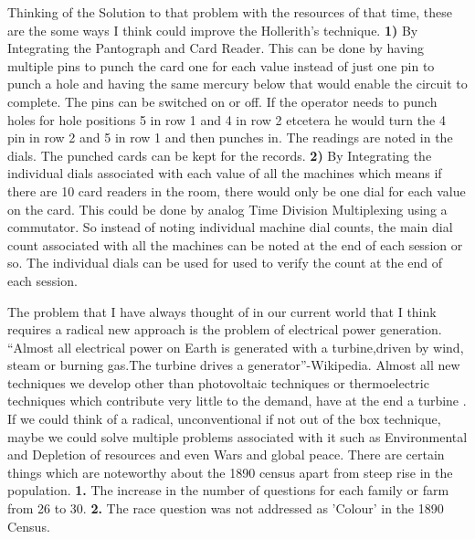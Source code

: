 \documentclass[fleqn,letterpaper,12pt]{report}
\begin{document}
\assignmenttitle

%
{}
\problem
Thinking of the Solution to that problem with the resources of that time, these are the some ways I think could improve the Hollerith’s technique.\newline
\textbf{1)} By Integrating the Pantograph and Card Reader. This can be done by having multiple pins to punch the card one for each value instead of just one pin to punch a hole and having the same mercury below that would enable the circuit to complete. The pins can be switched on or off. If the operator needs to punch holes for hole positions 5 in row 1 and 4 in row 2 etcetera he would turn the 4 pin in row 2 and 5 in row 1 and then punches in. The readings are noted in the dials. The punched cards can be kept for the records.\newline
\textbf{2)} By Integrating the individual dials associated with each value of all the machines which means if there are 10 card readers in the room, there would only be one dial for each value on the card. This could be done by analog Time Division Multiplexing using a commutator. So instead of noting individual machine dial counts, the main dial count associated with all the machines can be noted at the end of each session or so. The individual dials can be used for used to verify the count at the end of each session.\cite{Census}

The problem that I have always thought of in our current world that I think requires a radical new approach is the problem of electrical power generation. “Almost all electrical power on Earth is generated with a turbine,driven by wind, steam or burning gas.The turbine drives a generator”-Wikipedia.
Almost all new techniques we develop other than photovoltaic techniques or thermoelectric techniques which contribute very little to the demand, have at the end a turbine . If we could think of a radical, unconventional if not out of the box technique, maybe we could solve multiple problems associated with it such as Environmental and Depletion of resources and even Wars and global peace.\break
\newline
There are certain things which are noteworthy about the 1890 census apart from steep rise in the population.\newline
\textbf{1.} The increase in the number of questions for each family or farm from 26 to 30.\newline
\textbf{2.} The race question was not addressed as 'Colour' in the 1890 Census.
\end{document}
